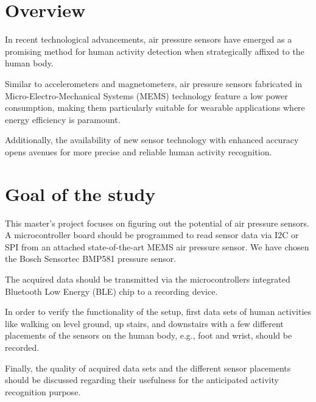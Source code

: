 \section{Overview}

In recent technological advancements, air pressure sensors have emerged as a promising method for human activity detection when strategically affixed to the human body. 

Similar to accelerometers and magnetometers, air pressure sensors fabricated in Micro-Electro-Mechanical Systems (MEMS) technology feature a low power consumption, making them particularly suitable for wearable applications where energy efficiency is paramount. 

Additionally, the availability of new sensor technology with enhanced accuracy opens avenues for more precise and reliable human activity recognition. 

\section{Goal of the study}

This master’s project focuses on figuring out the potential of air pressure sensors. A microcontroller board should be programmed to read sensor data via I2C or SPI from an attached state-of-the-art MEMS air pressure sensor. We have chosen the Bosch Sensortec BMP581 pressure sensor.

The acquired data should be transmitted via the microcontrollers integrated Bluetooth Low Energy (BLE) chip to a recording device. 

In order to verify the functionality of the setup, first data sets of human activities like walking on level ground, up stairs, and downstairs with a few different placements of the sensors on the human body, e.g., foot and wrist, should be recorded. 

Finally, the quality of acquired data sets and the different sensor placements should be discussed regarding their usefulness for the anticipated activity recognition purpose.